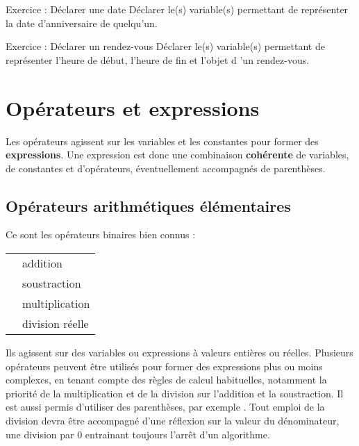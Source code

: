 			\begin{Emphase}{Exercice : Déclarer une date}
				Déclarer le(s) variable(s) permettant de représenter la date
				d'anniversaire de quelqu'un.
			\end{Emphase}
			
			\begin{Emphase}{Exercice : Déclarer un rendez-vous}
				Déclarer le(s) variable(s) permettant de représenter
				l'heure de début, l'heure de fin et
				l'objet d 'un rendez-vous.
			\end{Emphase}

	\section{Opérateurs et expressions}
	
		Les opérateurs agissent sur les variables et les constantes pour former
		des \textbf{expressions}. Une expression est donc une combinaison
		\textbf{cohérente} de variables, de constantes et d’opérateurs,
		éventuellement accompagnés de parenthèses.
	
		\subsection{Opérateurs arithmétiques élémentaires}
	
			Ce sont les opérateurs binaires bien connus :
	
			\begin{center}
			\tablehead{}
			\begin{supertabular}{m{1cm}|m{12cm}}
			\raggedleft  \textstyleCodeInsr{+} & addition\\
			\raggedleft  \textstyleCodeInsr{-} & soustraction\\
			\raggedleft  \textstyleCodeInsr{*} & multiplication\\
			\raggedleft  \textstyleCodeInsr{/} & division réelle\\
			\end{supertabular}
			\end{center}
	
			Ils agissent sur des variables ou expressions à valeurs entières ou
			réelles. Plusieurs opérateurs peuvent être utilisés pour former des
			expressions plus ou moins complexes, en tenant compte des règles de
			calcul habituelles, notamment la priorité de la multiplication et de la
			division sur l’addition et la soustraction. Il est aussi permis
			d’utiliser des parenthèses, par exemple . Tout emploi de la division devra être accompagné d’une réflexion
			sur la valeur du dénominateur, une division par 0 entrainant toujours
			l’arrêt d’un algorithme.
	
